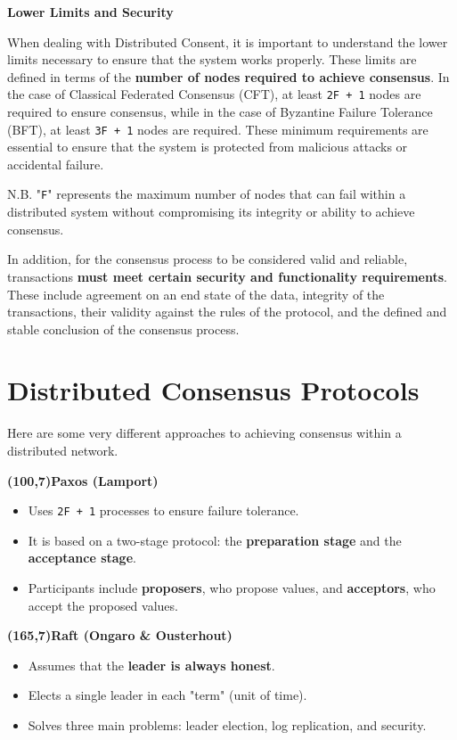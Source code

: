 \faLock \quad \textbf{Lower Limits and Security}

When dealing with Distributed Consent, it is important to understand the lower limits necessary to ensure that the system works properly. These limits are defined in terms of the \textbf{number of nodes required to achieve consensus}. In the case of Classical Federated Consensus (CFT), at least \texttt{2F + 1} nodes are required to ensure consensus, while in the case of Byzantine Failure Tolerance (BFT), at least \texttt{3F + 1} nodes are required. These minimum requirements are essential to ensure that the system is protected from malicious attacks or accidental failure.

N.B. "\texttt{F}" represents the maximum number of nodes that can fail within a distributed system without compromising its integrity or ability to achieve consensus.

In addition, for the consensus process to be considered valid and reliable, transactions \textbf{must meet certain security and functionality requirements}. These include agreement on an end state of the data, integrity of the transactions, their validity against the rules of the protocol, and the defined and stable conclusion of the consensus process. 

\section{Distributed Consensus Protocols}
Here are some very different approaches to achieving consensus within a distributed network.

\colorbox{Orange!70}{\textbf{\makebox(100,7){Paxos (Lamport)}}}
\vspace{-0.3cm}
\begin{itemize}
    \item Uses \texttt{2F + 1} processes to ensure failure tolerance.
    \item It is based on a two-stage protocol: the \textbf{preparation stage} and the \textbf{acceptance stage}.
    \item Participants include \textbf{proposers}, who propose values, and \textbf{acceptors}, who accept the proposed values.
\end{itemize}


\colorbox{Orange!70}{\textbf{\makebox(165,7){Raft (Ongaro \& Ousterhout)}}}
\vspace{-0.3cm}
\begin{itemize}
    \item Assumes that the \textbf{leader is always honest}.
    \item Elects a single leader in each "term" (unit of time).
    \item Solves three main problems: leader election, log replication, and security.
\end{itemize}

